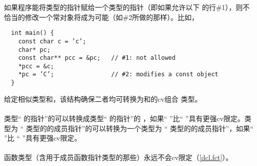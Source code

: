 \begin{note}
  如果程序能将类型的指针赋给一个类型的指针（即如果允许以下
  的行\#1），则不恰当的修改一个常对象将成为可能（如\#2所做的那样）。比如，
  \begin{lstlisting}
  int main() {
    const char c = ’c’;
    char* pc;
    const char** pcc = &pc;   // #1: not allowed
    *pcc = &c;
    *pc = ’C’;                // #2: modifies a const object
  }
  \end{lstlisting}
\end{note}

\begin{note}
  给定相似类型和，该结构确保二者均可转换为和的cv组合
  类型。
\end{note}

\paragraph{} %
\begin{note}
  类型“ 的指针”的\prvalue{}可以转换成类型“ 的指针”的
  \prvalue{}，如果“ ”比“ ”具有更强cv限定。类型为
  “ 类型的的成员指针”的\prvalue{}可以转换为一个类型为
  “ 类型的的成员指针”，如果“ ”比
  “ ”具有更强cv限定。
\end{note}

\paragraph{} %
\begin{note}
  函数类型（含用于成员函数指针类型的那些）永远不会cv限定（\ref{dcl.fct}）。
\end{note}
